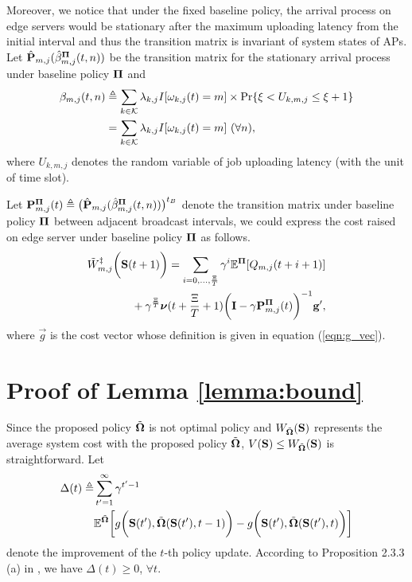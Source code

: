 Moreover, we notice that under the fixed baseline policy, the arrival process on edge servers would be stationary after the maximum uploading latency from the initial interval and thus the transition matrix is invariant of system states of APs.
Let $\hat{\mathbf{P}}_{m,j}(\hat{\beta}^{\boldsymbol{\Pi}}_{m,j}(t,n))$ be the transition matrix for the stationary arrival process under baseline policy $\boldsymbol{\Pi}$ and
{\small
\begin{align}
    \beta_{m,j}(t,n) &\triangleq \sum_{k\in\mathcal{K}} \lambda_{k,j}I[\omega_{k,j}(t)=m] \times \Pr\{ \xi<U_{k,m,j}\le\xi+1 \}
    \nonumber\\
    &= \sum_{k\in\mathcal{K}} \lambda_{k,j}I[\omega_{k,j}(t)=m]\ (\forall n),
\end{align}
}where $U_{k,m,j}$ denotes the random variable of job uploading latency (with the unit of time slot).

Let
$\mathbf{P}^{\boldsymbol{\Pi}}_{m,j}(t) \triangleq \big( \hat{\mathbf{P}}_{m,j}(\hat{\beta}^{\boldsymbol{\Pi}}_{m,j}(t,n)) \big)^{t_B}$
denote the transition matrix under baseline policy $\boldsymbol{\Pi}$ between adjacent broadcast intervals, we could express the cost raised on edge server under baseline policy $\boldsymbol{\Pi}$ as follows.
{\small
\begin{align}
    &\tilde{W}^{\ddagger}_{m,j}\bigg(\mathbf{S}(t+1)\bigg)
    = \sum_{i=0,\dots,\frac{\Xi}{T}} \gamma^{i} \mathbb{E}^{\boldsymbol{\Pi}}[ Q_{m,j}({t+i+1}) ]
    \nonumber\\
    &~~~~~~~~~~~~+ \gamma^{\frac{\Xi}{T}} 
    \boldsymbol{\nu}({t+\frac{\Xi}{T}+1})
    \bigg(
        \mathbf{I} - \gamma \mathbf{P}^{\boldsymbol{\Pi}}_{m,j}(t)
    \bigg)^{-1} \mathbf{g}',
\end{align}   
}
where $\vec{g}$ is the cost vector whose definition is given in equation (\ref{eqn:g_vec}).

\section{ Proof of Lemma \ref{lemma:bound} }
\label{append_3}
Since the proposed policy $\tilde{\boldsymbol{\Omega}}$ is not optimal policy and $W_{\tilde{\boldsymbol{\Omega}}}(\mathbf{S})$ represents the average system cost with the proposed policy $\tilde{\boldsymbol{\Omega}}$, $V(\mathbf{S}) \leq W_{\tilde{\boldsymbol{\Omega}}}(\mathbf{S})$ is straightforward.
Let 
{\small
\begin{align*}
    \Delta(t) \triangleq &
    \sum_{t'=1}^{\infty} \gamma^{t'-1}\\\nonumber
    &\mathbb{E}^{ \tilde{\boldsymbol{\Omega}} } \bigg[
        g\bigg(\mathbf{S}(t'), \tilde{\boldsymbol{\Omega}}(\mathbf{S}(t'),t-1)\bigg)
        -  g\bigg(\mathbf{S}(t'), \tilde{\boldsymbol{\Omega}}(\mathbf{S}(t'),t)\bigg)
    \bigg]
\end{align*}
}
denote the improvement of the $t$-th policy update.
According to Proposition 2.3.3 (a) in \cite{dp-control}, we have $\Delta(t)\geq 0$, $\forall t$.

